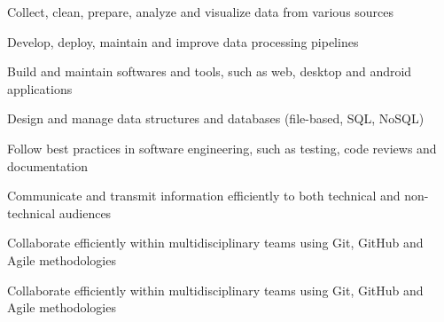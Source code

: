 

\begin{cvskills}

  \begin{minipage}[t]{0.45\textwidth}
    \cvskill
      {Collect, clean, prepare, analyze and visualize data from various sources}
  \end{minipage}\hfill
  \begin{minipage}[t]{0.45\textwidth}
    \cvskill
      {Develop, deploy, maintain and improve data processing pipelines}
  \end{minipage}

  \begin{minipage}[t]{0.45\textwidth}
    \cvskill
      {Build and maintain softwares and tools, such as web, desktop and android applications}
  \end{minipage}\hfill
  \begin{minipage}[t]{0.45\textwidth}
    \cvskill
      {Design and manage data structures and databases (file-based, SQL, NoSQL)}
  \end{minipage}

  \begin{minipage}[t]{0.45\textwidth}
    \cvskill
      {Follow best practices in software engineering, such as testing, code reviews and documentation}
  \end{minipage}\hfill
  \begin{minipage}[t]{0.45\textwidth}
    \cvskill
      {Communicate and transmit information efficiently to both technical and non-technical audiences}
  \end{minipage}

  \begin{minipage}[t]{0.45\textwidth}
    \cvskill
      {Collaborate efficiently within multidisciplinary teams using Git, GitHub and Agile methodologies}
  \end{minipage}\hfill
  \begin{minipage}[t]{0.45\textwidth}
    \cvskill
      {Collaborate efficiently within multidisciplinary teams using Git, GitHub and Agile methodologies}
  \end{minipage}

\end{cvskills}